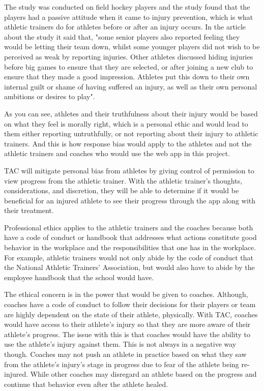 \documentclass[10pt,twocolumn]{article}
\begin{document}
The study was conducted on field hockey players and the study found that the players had a passive attitude when it came to injury prevention, which is what athletic trainers do for athletes before or after an injury occurs. In the article about the study it said that, "some senior players also reported feeling they would be letting their team down, whilst some younger players did not wish to be perceived as weak by reporting injuries. Other athletes discussed hiding injuries before big games to ensure that they are selected, or after joining a new club to ensure that they made a good impression. Athletes put this down to their own internal guilt or shame of having suffered an injury, as well as their own personal ambitions or desires to play".\cite{fieldhockey} 

As you can see, athletes and their truthfulness about their injury would be based on what they feel is morally right, which is a personal ethic and would lead to them either reporting untruthfully, or not reporting about their injury to athletic trainers. And this is how response bias would apply to the athletes and not the athletic trainers and coaches who would use the web app in this project.

TAC will mitigate personal bias from athletes by giving control of permission to view progress from the athletic trainer. With the athletic trainer's thoughts, considerations, and discretion, they will be able to determine if it would be beneficial for an injured athlete to see their progress through the app along with their treatment.

Professional ethics applies to the athletic trainers and the coaches because both have a code of conduct or handbook that addresses what actions constitute good behavior in the workplace and the responsibilities that one has in the workplace. For example, athletic trainers would not only abide by the code of conduct that the National Athletic Trainers' Association, but would also have to abide by the employee handbook that the school would have.

The ethical concern is in the power that would be given to coaches. Although, coaches have a code of conduct to follow their decisions for their players or team are highly dependent on the state of their athlete, physically. With TAC, coaches would have access to their athlete's injury so that they are more aware of their athlete's progress. The issue with this is that coaches would have the ability to use the athlete's injury against them. This is not always in a negative way though. Coaches may not push an athlete in practice based on what they saw from the athlete's injury's stage in progress due to fear of the athlete being re-injured. While other coaches may disregard an athlete based on the progress and continue that behavior even after the athlete healed.
\end{document}
